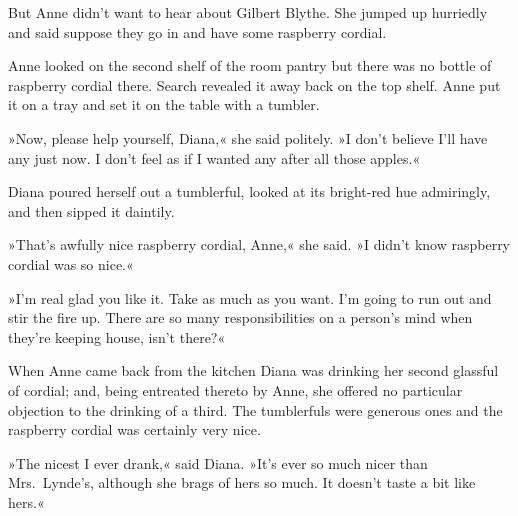 But Anne didn't want to hear about Gilbert Blythe. She jumped up hurriedly and said suppose they go in and have some raspberry cordial.

Anne looked on the second shelf of the room pantry but there was no bottle of raspberry cordial there. Search revealed it away back on the top shelf. Anne put it on a tray and set it on the table with a tumbler.

»Now, please help yourself, Diana,« she said politely. »I don't believe I'll have any just now. I don't feel as if I wanted any after all those apples.«

Diana poured herself out a tumblerful, looked at its bright-red hue admiringly, and then sipped it daintily.

»That's awfully nice raspberry cordial, Anne,« she said. »I didn't know raspberry cordial was so nice.«

»I'm real glad you like it. Take as much as you want. I'm going to run out and stir the fire up. There are so many responsibilities on a person's mind when they're keeping house, isn't there?«

When Anne came back from the kitchen Diana was drinking her second glassful of cordial; and, being entreated thereto by Anne, she offered no particular objection to the drinking of a third. The tumblerfuls were generous ones and the raspberry cordial was certainly very nice.

»The nicest I ever drank,« said Diana. »It's ever so much nicer than Mrs.~Lynde's, although she brags of hers so much. It doesn't taste a bit like hers.«

